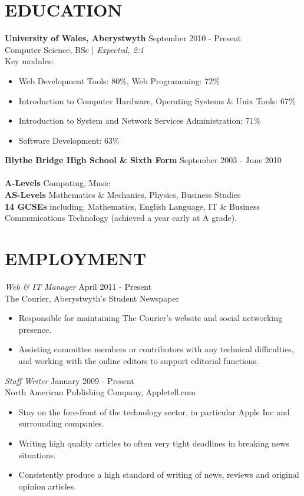 \documentclass[line,margin]{res}
\begin{document}
\begin{resume}
\section{EDUCATION} {\bf University of Wales, Aberystwyth} \hfill September 2010 - Present\\
               Computer Science, BSc | {\sl Expected, 2:1}\\
Key modules: 
\begin{itemize} \itemsep -2pt
\item Web Development Tools: 80\%, Web Programming: 72\%
\item Introduction to Computer Hardware, Operating Systems \& Unix Tools: 67\%
\item Introduction to System and Network Services Administration: 71\%
\item Software Development: 63\%\\
\end{itemize}
{\bf Blythe Bridge High School \& Sixth Form} \hfill September 2003 - June 2010 \\ \\
{\bf A-Levels} Computing, Music\\
{\bf AS-Levels} Mathematics \& Mechanics, Physics, Business Studies\\
{\bf 14 GCSEs} including, Mathematics, English Language, IT \& Business Communications Technology (achieved a year early at A grade).

\newpage
\section{EMPLOYMENT}
	{\sl Web \& IT Manager} \hfill April 2011 - Present \\
	The Courier, Aberystwyth's Student Newspaper
	\begin{itemize} \itemsep -2pt
	\item Responsible for maintaining The Courier's website and social networking presence.
	\item Assisting committee members or contributors with any technical difficulties, and working with the online editors to support editorial functions.
	\end{itemize}


	       {\sl Staff Writer} \hfill January 2009 - Present \\
                North American Publishing Company, Appletell.com
                 \begin{itemize}  \itemsep -2pt %
                 \item Stay on the fore-front of the technology sector, in particular Apple Inc and surrounding companies.
	       \item Writing high quality articles to often very tight deadlines in breaking news situations.
	       \item Consistently produce a high standard of writing of news, reviews and original opinion articles.
                \end{itemize}
 

\end{resume}
\end{document}
